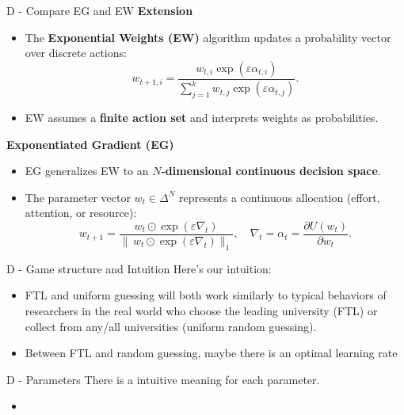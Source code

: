 \documentclass{beamer}
\begin{document}
\begin{frame}{D - Compare EG and EW}
\textbf{Extension}
    \begin{itemize}
        \item The \textbf{Exponential Weights (EW)} algorithm updates 
              a probability vector over discrete actions:
              \[
              w_{t+1,i} 
              = 
              \frac{
                  w_{t,i} \exp(\varepsilon \alpha_{t,i})
              }{
                  \sum_{j=1}^{k} w_{t,j} \exp(\varepsilon \alpha_{t,j})
              }.
              \]
        \item EW assumes a \textbf{finite action set} and interprets weights as probabilities.
    \end{itemize}
\textbf{Exponentiated Gradient (EG)}
    \begin{itemize}
        \item EG generalizes EW to an \textbf{$N$-dimensional continuous decision space}.
        \item The parameter vector $w_t \in \Delta^N$ represents 
              a continuous allocation (effort, attention, or resource):
              \[
              w_{t+1}
              = 
              \frac{
                  w_t \odot \exp(\varepsilon \nabla_t)
              }{
                  \|\,w_t \odot \exp(\varepsilon \nabla_t)\|_1
              },
              \quad
              \nabla_t = \alpha_t = \frac{\partial U(w_t)}{\partial w_t}.
              \]
    \end{itemize}
\end{frame}

\begin{frame}{D - Game structure and Intuition}
Here's our intuition:
\begin{itemize}
    \item FTL and uniform guessing will both work similarly to typical behaviors of researchers in the real world who choose the leading university (FTL) or collect from any/all universities (uniform random guessing).
    \item Between FTL and random guessing, maybe there is an optimal learning rate
\end{itemize}
\end{frame}

\begin{frame}{D - Parameters}
There is a intuitive meaning for each parameter.
\begin{itemize}
    \item 
\end{itemize}
\end{frame}
\end{document}
